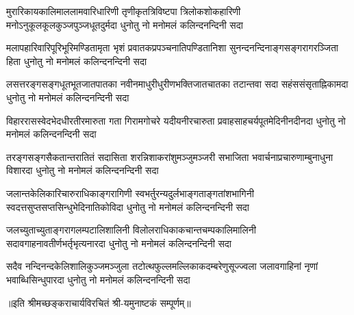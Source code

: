 
\fourlineindentedshloka
{मुरारिकायकालिमाललामवारिधारिणी}
{तृणीकृतत्रिविष्टपा त्रिलोकशोकहारिणी}
{मनोऽनुकूलकूलकुञ्जपुञ्जधूतदुर्मदा}
{धुनोतु नो मनोमलं कलिन्दनन्दिनी सदा}%

\fourlineindentedshloka
{मलापहारिवारिपूरिभूरिमण्डितामृता}
{भृशं प्रवातकप्रपञ्चनातिपण्डितानिशा}
{सुनन्दनन्दिनाङ्गसङ्गरागरञ्जिता हिता}
{धुनोतु नो मनोमलं कलिन्दनन्दिनी सदा}%

\fourlineindentedshloka
{लसत्तरङ्गसङ्गधूतभूतजातपातका}
{नवीनमाधुरीधुरीणभक्तिजातचातका}
{तटान्तवा  सदा  सहंससंसृताह्निकामदा} 
{धुनोतु नो मनोमलं कलिन्दनन्दिनी सदा}%

\fourlineindentedshloka
{विहाररासस्वेदभेदधीरतीरमारुता}
{गता गिरामगोचरे यदीयनीरचारुता}
{प्रवाहसाहचर्यपूतमेदिनीनदीनदा}
{धुनोतु नो मनोमलं कलिन्दनन्दिनी सदा}%

\fourlineindentedshloka
{तरङ्गसङ्गसैकतान्तरातितं सदासिता}
{शरन्निशाकरांशुमञ्जुमञ्जरी सभाजिता}
{भवार्चनाप्रचारुणाम्बुनाधुना विशारदा}
{धुनोतु नो मनोमलं कलिन्दनन्दिनी सदा}%

\fourlineindentedshloka
{जलान्तकेलिकारिचारुराधिकाङ्गरागिणी}
{स्वभर्तुरन्यदुर्लभाङ्गताङ्गतांशभागिनी}
{स्वदत्तसुप्तसप्तसिन्धुभेदिनातिकोविदा}
{धुनोतु नो मनोमलं कलिन्दनन्दिनी सदा}%

\fourlineindentedshloka
{जलच्युताच्युताङ्गरागलम्पटालिशालिनी}
{विलोलराधिकाकचान्तचम्पकालिमालिनी}
{सदावगाहनावतीर्णभर्तृभृत्यनारदा}
{धुनोतु नो मनोमलं कलिन्दनन्दिनी सदा}%

\fourlineindentedshloka
{सदैव नन्दिनन्दकेलिशालिकुञ्जमञ्जुला}
{तटोत्थफुल्लमल्लिकाकदम्बरेणुसूज्ज्वला}
{जलावगाहिनां नृणां भवाब्धिसिन्धुपारदा}
{धुनोतु नो मनोमलं कलिन्दनन्दिनी सदा}%

॥इति श्रीमच्छङ्कराचार्यविरचितं श्री-यमुनाष्टकं सम्पूर्णम्॥
